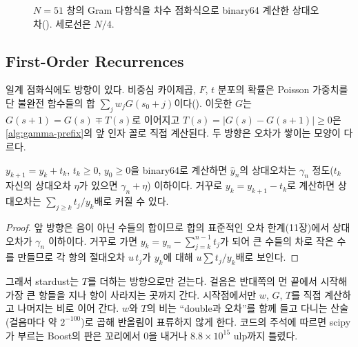 \begin{figure}[htbp]
\centering
{}
\caption{$N=51$ 창의 Gram 다항식을 차수 점화식으로 binary64 계산한 상대오차(). 세로선은 $N/4$.}
\label{fig:gram}
\end{figure}

\subsection{First-Order Recurrences}

일계 점화식에도 방향이 있다. 비중심 카이제곱, $F$, $t$ 분포의 확률은 Poisson 가중치를 단 불완전 함수들의 합 $\sum_jw_jG(s_0+j)$이다(). 이웃한 $G$는 $G(s+1)=G(s)\mp T(s)$로 이어지고 $T(s)=|G(s)-G(s+1)|\ge0$은 \cref{alg:gamma-prefix}의 앞 인자 꼴로 직접 계산된다. 두 방향은 오차가 쌓이는 모양이 다르다.

\begin{proposition}
\label{prop:first-order}
$y_{k+1}=y_k+t_k$, $t_k\ge0$, $y_0\ge0$을 binary64로 계산하면 $\hat y_n$의 상대오차는 $\gamma_n$ 정도($t_k$ 자신의 상대오차 $\eta$가 있으면 $\gamma_n+\eta$) 이하이다. 거꾸로 $y_k=y_{k+1}-t_k$로 계산하면 상대오차는 $\sum_{j\ge k}t_j/y_k$배로 커질 수 있다.
\end{proposition}

\begin{proof}
앞 방향은 음이 아닌 수들의 합이므로 합의 표준적인 오차 한계(11장)에서 상대오차가 $\gamma_n$ 이하이다. 거꾸로 가면 $y_k=y_n-\sum_{j=k}^{n-1}t_j$가 되어 큰 수들의 차로 작은 수를 만들므로 각 항의 절대오차 $u\,t_j$가 $y_k$에 대해 $u\sum t_j/y_k$배로 보인다.
\end{proof}

그래서 stardust는 $T$를 더하는 방향으로만 걷는다. 걸음은 반대쪽의 먼 끝에서 시작해 가장 큰 항들을 지나 항이 사라지는 곳까지 간다. 시작점에서만 $w$, $G$, $T$를 직접 계산하고 나머지는 비로 이어 간다. $w$와 $T$의 비는 ``double과 오차''를 함께 들고 다니는 산술(걸음마다 약 $2^{-100}$)로 곱해 반올림이 표류하지 않게 한다. 코드의 주석에 따르면 scipy가 부르는 Boost의 판은 꼬리에서 $0$을 내거나 $8.8\times10^{15}$ ulp까지 틀렸다.

